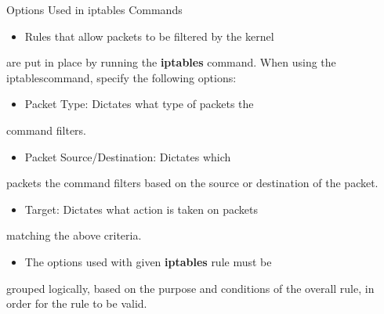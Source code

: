 \begin{frame}[t,allowframebreaks]{Options Used in iptables Commands}
  \fontsize{15}{18}\selectfont
  \begin{itemize}
    \item Rules that allow packets to be filtered by the kernel
  \end{itemize}
  are put in place by running the \textcolor{CommandGreen}{\bfseries iptables} command. When using the iptablescommand, specify the following options:\par
  \begin{itemize}
    \item Packet Type: Dictates what type of packets the
  \end{itemize}
  command filters.\par
  \begin{itemize}
    \item Packet Source/Destination: Dictates which
  \end{itemize}
  packets the command filters based on the source or destination of the packet.\par
  \begin{itemize}
    \item Target: Dictates what action is taken on packets
  \end{itemize}
  matching the above criteria.\par
  \begin{itemize}
    \item The options used with given \textcolor{CommandGreen}{\bfseries iptables} rule must be
  \end{itemize}
  grouped logically, based on the purpose and conditions of the overall rule, in order for the rule to be valid.\par
\end{frame}
